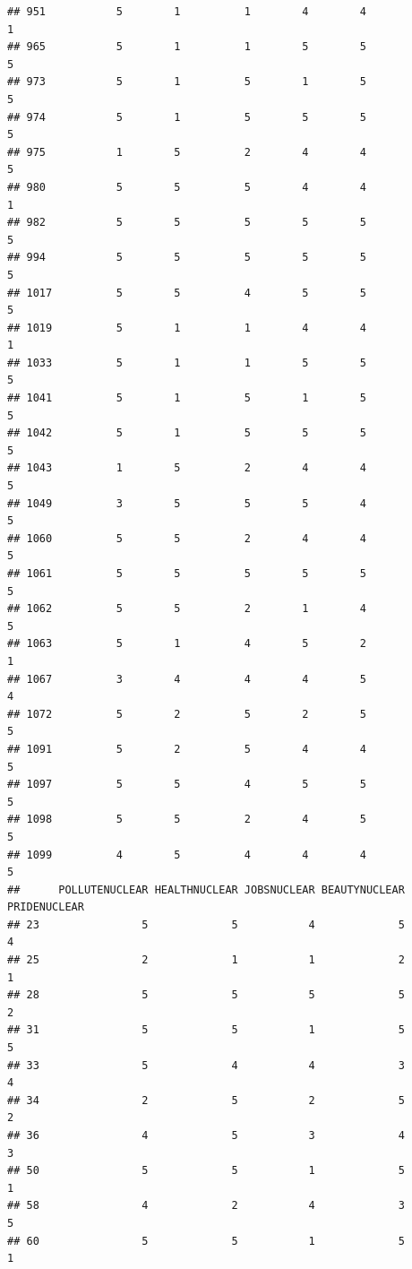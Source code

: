 \documentclass[
]{article}
\begin{document}
\begin{verbatim}
## 951           5        1          1        4        4               1
## 965           5        1          1        5        5               5
## 973           5        1          5        1        5               5
## 974           5        1          5        5        5               5
## 975           1        5          2        4        4               5
## 980           5        5          5        4        4               1
## 982           5        5          5        5        5               5
## 994           5        5          5        5        5               5
## 1017          5        5          4        5        5               5
## 1019          5        1          1        4        4               1
## 1033          5        1          1        5        5               5
## 1041          5        1          5        1        5               5
## 1042          5        1          5        5        5               5
## 1043          1        5          2        4        4               5
## 1049          3        5          5        5        4               5
## 1060          5        5          2        4        4               5
## 1061          5        5          5        5        5               5
## 1062          5        5          2        1        4               5
## 1063          5        1          4        5        2               1
## 1067          3        4          4        4        5               4
## 1072          5        2          5        2        5               5
## 1091          5        2          5        4        4               5
## 1097          5        5          4        5        5               5
## 1098          5        5          2        4        5               5
## 1099          4        5          4        4        4               5
##      POLLUTENUCLEAR HEALTHNUCLEAR JOBSNUCLEAR BEAUTYNUCLEAR PRIDENUCLEAR
## 23                5             5           4             5            4
## 25                2             1           1             2            1
## 28                5             5           5             5            2
## 31                5             5           1             5            5
## 33                5             4           4             3            4
## 34                2             5           2             5            2
## 36                4             5           3             4            3
## 50                5             5           1             5            1
## 58                4             2           4             3            5
## 60                5             5           1             5            1

\end{verbatim}
\end{document}
